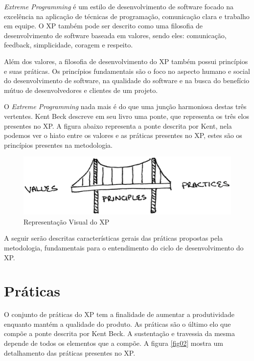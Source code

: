 \textit{Extreme Programming} é um estilo de desenvolvimento de software focado na excelência na aplicação de técnicas de programação, comunicação clara e trabalho em equipe. O XP também pode ser descrito como uma filosofia de desenvolvimento de software baseada em valores, sendo eles: comunicação, feedback, simplicidade, coragem e respeito. \cite{Beck:1999}

Além dos valores, a filosofia de desenvolvimento do XP também possui princípios e suas práticas. Os princípios fundamentais são o foco no aspecto humano e social do desenvolvimento de software, na qualidade do software e na busca do benefício mútuo  de desenvolvedores e clientes de um projeto.\cite{Beck:2004}

O \textit{Extreme Programming} nada mais é do que uma junção harmoniosa destas três vertentes. Kent Beck descreve em seu livro uma ponte, que representa os três elos presentes no XP. A figura abaixo representa a ponte descrita por Kent, nela podemos ver o hiato entre os valores e as práticas presentes no XP,  estes são os princípios presentes na metodologia.\cite{Beck:2004}

\begin{figure}[h]
	\centering
	\includegraphics[keepaspectratio=true,scale=0.7]{figuras/fig01.eps}
	\caption{Representação Visual do XP \cite{Beck:2004}}
	\label{fig01}
\end{figure}

A seguir serão descritas características gerais das práticas propostas pela metodologia, fundamentais para o entendimento do ciclo de desenvolvimento do XP.

\section{Práticas}

O conjunto de práticas do XP tem a finalidade de aumentar a produtividade enquanto mantém a qualidade do produto. \cite{Maurer:2002} As práticas são o último elo que compõe a ponte descrita por Kent Beck. A sustentação e travessia da mesma depende de todos os elementos que a compõe. A figura \ref{fig02} mostra um detalhamento das práticas presentes no XP.

